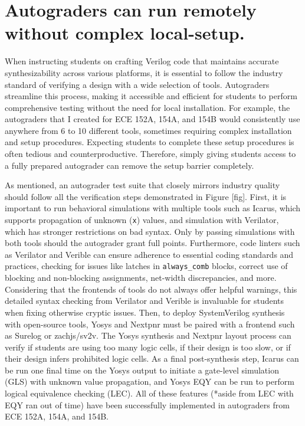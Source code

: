 \section{Autograders can run remotely without complex local-setup.}

When instructing students on crafting Verilog code that maintains accurate synthesizability across various platforms, it is essential to follow the industry standard of verifying a design with a wide selection of tools. Autograders streamline this process, making it accessible and efficient for students to perform comprehensive testing without the need for local installation. For example, the autograders that I created for ECE 152A, 154A, and 154B would consistently use anywhere from 6 to 10 different tools, sometimes requiring complex installation and setup procedures. Expecting students to complete these setup procedures is often tedious and counterproductive. Therefore, simply giving students access to a fully prepared autograder can remove the setup barrier completely.

As mentioned, an autograder test suite that closely mirrors industry quality should follow all the verification steps demonstrated in Figure [fig]. First, it is important to run behavioral simulations with multiple tools such as Icarus, which supports propagation of unknown (\texttt{x}) values, and simulation with Verilator, which has stronger restrictions on bad syntax. Only by passing simulations with both tools should the autograder grant full points. Furthermore, code linters such as Verilator and Verible can ensure adherence to essential coding standards and practices, checking for issues like latches in \texttt{always_comb} blocks, correct use of blocking and non-blocking assignments, net-width discrepancies, and more. Considering that the frontends of tools do not always offer helpful warnings, this detailed syntax checking from Verilator and Verible is invaluable for students when fixing otherwise cryptic issues. Then, to deploy SystemVerilog synthesis with open-source tools, Yosys and Nextpnr must be paired with a frontend such as Surelog or zachjs/sv2v. The Yosys synthesis and Nextpnr layout process can verify if students are using too many logic cells, if their design is too slow, or if their design infers prohibited logic cells. As a final post-synthesis step, Icarus can be run one final time on the Yosys output to initiate a gate-level simulation (GLS) with unknown value propagation, and Yosys EQY can be run to perform logical equivalence checking (LEC). All of these features (*aside from LEC with EQY {ran out of time}) have been successfully implemented in autograders from ECE 152A, 154A, and 154B.

